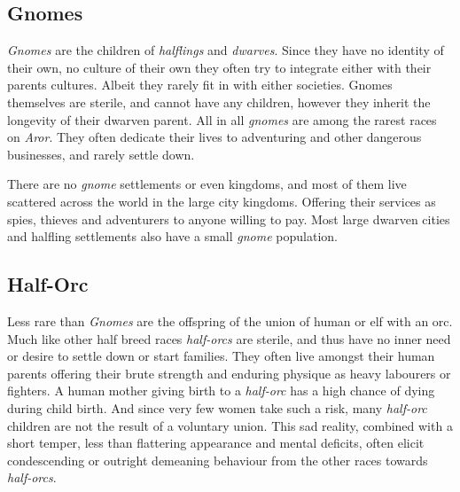 \subsection*{Gnomes}

\emph{Gnomes} are the children of \emph{halflings} and \emph{dwarves}. Since
they have no identity of their own, no culture of their own they often try to
integrate either with their parents cultures. Albeit they rarely fit in with
either societies. Gnomes themselves are sterile, and cannot have any children,
however they inherit the longevity of their dwarven parent. All in
all \emph{gnomes} are among the rarest races on \emph{Aror}. They often
dedicate their lives to adventuring and other dangerous businesses, and rarely
settle down.

There are no \emph{gnome} settlements or even kingdoms, and most of them live
scattered across the world in the large city kingdoms. Offering their services
as spies, thieves and adventurers to anyone willing to pay. Most large dwarven
cities and halfling settlements also have a small \emph{gnome} population.

\subsection*{Half-Orc}

Less rare than \emph{Gnomes} are the offspring of the union of human or elf
with an orc. Much like other half breed races \emph{half-orcs} are sterile,
and thus have no inner need or desire to settle down or start families. They
often live amongst their human parents offering their brute strength and
enduring physique as heavy labourers or fighters. A human mother giving birth
to a \emph{half-orc} has a high chance of dying during child birth. And since
very few women take such a risk, many \emph{half-orc} children are not the
result of a voluntary union. This sad reality, combined with a short temper,
less than flattering appearance and mental deficits, often elicit condescending
or outright demeaning behaviour from the other races towards \emph{half-orcs}.
